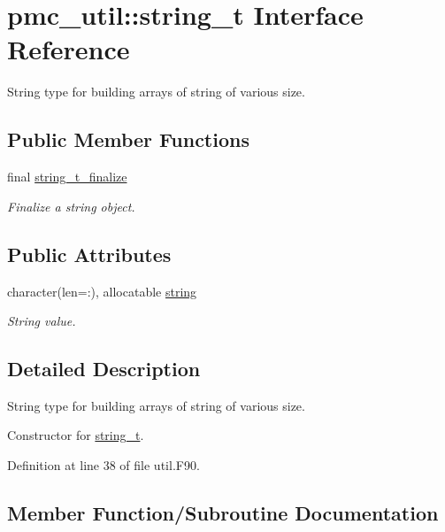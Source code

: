\hypertarget{structpmc__util_1_1string__t}{}\section{pmc\+\_\+util\+:\+:string\+\_\+t Interface Reference}
\label{structpmc__util_1_1string__t}


String type for building arrays of string of various size.  


\subsection*{Public Member Functions}
\begin{DoxyCompactItemize}
\item 
final \mbox{\hyperlink{structpmc__util_1_1string__t_a630355f93c98271e0dd56f4ef9a5a0eb}{string\+\_\+t\+\_\+finalize}}
\begin{DoxyCompactList}\small\item\em Finalize a string object. \end{DoxyCompactList}\end{DoxyCompactItemize}
\subsection*{Public Attributes}
\begin{DoxyCompactItemize}
\item 
character(len=\+:), allocatable \mbox{\hyperlink{structpmc__util_1_1string__t_ac8f93877b726054873d5d17fb2e25e15}{string}}
\begin{DoxyCompactList}\small\item\em String value. \end{DoxyCompactList}\end{DoxyCompactItemize}


\subsection{Detailed Description}
String type for building arrays of string of various size. 

Constructor for \mbox{\hyperlink{structpmc__util_1_1string__t}{string\+\_\+t}}. 

Definition at line 38 of file util.\+F90.



\subsection{Member Function/\+Subroutine Documentation}
\mbox{\label{structpmc__util_1_1string__t_a630355f93c98271e0dd56f4ef9a5a0eb}} 
